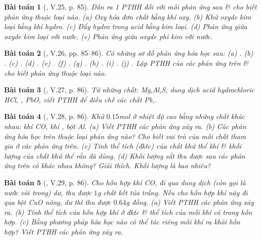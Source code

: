 \documentclass{article}
\newtheorem{baitoan}{Bài toán}
\begin{document}
\begin{baitoan}[\cite{Truong_BTNC_Hoa_Hoc_8_2022}, V.25, p. 85]
	Dẫn ra 1 PTHH đối với mỗi phản ứng sau \& cho biết phản ứng thuộc loại nào. (a) Oxy hóa đơn chất bằng khí oxy. (b) Khử oxyde kim loại bằng khí hydro. (c) Đẩy hydro trong acid bằng kim loại. (d) Phản ứng giữa oxyde kim loại với nước. (e) Phản ứng giữa oxyde phi kim với nước.
\end{baitoan}

\begin{baitoan}[\cite{Truong_BTNC_Hoa_Hoc_8_2022}, V.26, pp. 85--86]
	Có những sơ đồ phản ứng hóa học sau: (a) \emph{}. (b) \emph{}. (c) \emph{}. (d) \emph{}. (e) \emph{}. (f) \emph{}. (g) \emph{}. (h) \emph{}. (i) \emph{}. (j) \emph{}. Lập PTHH của các phản ứng trên \& cho biết phản ứng thuộc loại nào.
\end{baitoan}

\begin{baitoan}[\cite{Truong_BTNC_Hoa_Hoc_8_2022}, V.27, p. 86]
	Từ những chất: \emph{Mg,Al,S}, dung dịch acid hydrochloric \emph{HCl, , PbO}, viết PTHH để điều chế các chất \emph{Pb,}.
\end{baitoan}

\begin{baitoan}[\cite{Truong_BTNC_Hoa_Hoc_8_2022}, V.28, p. 86]
	Khử $0.15$\emph{mol } ở nhiệt độ cao bằng những chất khác nhau: khí \emph{CO}, khí \emph{}, bột \emph{Al}. (a) Viết PTHH các phản ứng xảy ra. (b) Các phản ứng hóa học trên thuộc loại phản ứng nào? Cho biết vai trò của mỗi chất tham gia ở các phản ứng trên. (c) Tính thể tích (đktc) của chất khử thể khí \& khối lượng của chất khử thể rắn đã dùng. (d) Khối lượng sắt thu được sau các phản ứng trên có khác nhau không? Giải thích. Khối lượng là bao nhiêu?
\end{baitoan}

\begin{baitoan}[\cite{Truong_BTNC_Hoa_Hoc_8_2022}, V.29, p. 86]
	Cho hỗn hợp khí \emph{CO,} đi qua dung dịch \emph{} (còn gọi là \emph{nước vôi trong}) dư, thu được $1$\emph{g} chất kết tủa trắng. Nếu cho hỗn hợp khí này đi qua bột \emph{CuO} nóng, dư thì thu được $0.64$\emph{g} đồng. (a) Viết PTHH các phản ứng xảy ra. (b) Tính thể tích của hỗn hợp khí ở đktc \& thể tích của mỗi khí có trong hỗn hợp. (c) Bằng phương pháp hóa học nào có thể tác riêng mỗi khí ra khỏi hỗn hợp? Viết PTHH các phản ứng xảy ra.
\end{baitoan}
\end{document}
